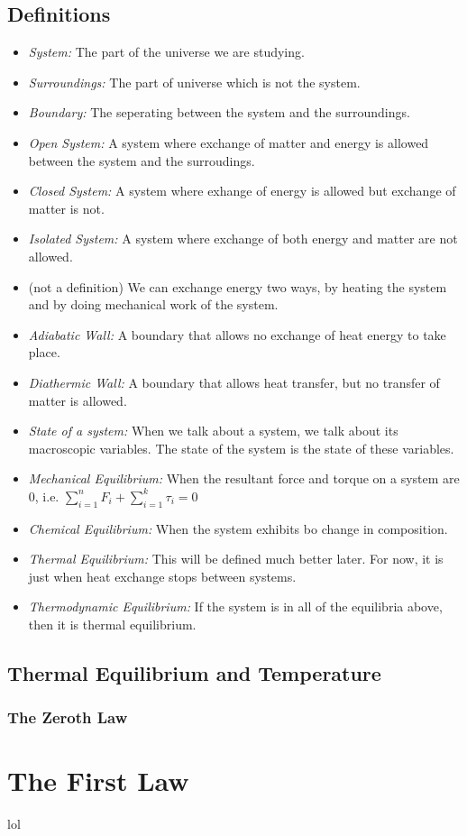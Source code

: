 \documentclass[a4paper]{article}
\begin{document}
   \subsection{Definitions}
   \begin{itemize}
       \item \emph{System: } The part of the universe we are studying.
       \item \emph{Surroundings: }The part of universe which is not the system.
       \item \emph{Boundary: }The seperating between the system and the surroundings.
       \item \emph{Open System: }A system where exchange of matter and energy is allowed between the system and the surroudings.
       \item \emph{Closed System: }A system where exhange of energy is allowed but exchange of matter is not.
       \item \emph{Isolated System: }A system where exchange of both energy and matter are not allowed.
       \item (not a definition) We can exchange energy two ways, by heating the system and by doing mechanical work of the system.
       \item \emph{Adiabatic Wall: }A boundary that allows no exchange of heat energy to take place.
       \item \emph{Diathermic Wall: }A boundary that allows heat transfer, but no transfer of matter is allowed.
       \item \emph{State of a system: }When we talk about a system, we talk about its macroscopic variables. The state of the system is the state of these variables.
       \item \emph{Mechanical Equilibrium: }When the resultant force and torque on a system are 0, i.e. \(\sum_{i=1}^{n}F_i + \sum_{i=1}^{k}\tau_i = 0\)
       \item \emph{Chemical Equilibrium: }When the system exhibits bo change in composition.
       \item \emph{Thermal Equilibrium: }This will be defined much better later. For now, it is just when heat exchange stops between systems.
       \item \emph{Thermodynamic Equilibrium: }If the system is in all of the equilibria above, then it is thermal equilibrium.
   \end{itemize}
   \subsection{Thermal Equilibrium and Temperature}
   \subsubsection{The Zeroth Law}
   
   \section{The First Law}
   lol
    


   
\end{document}
